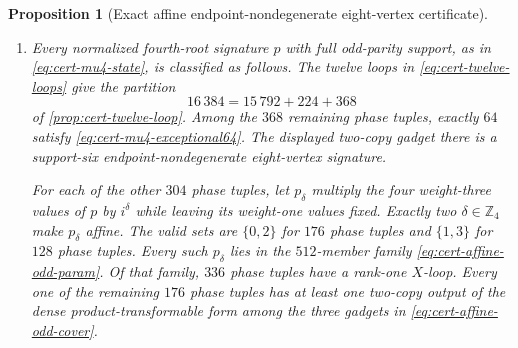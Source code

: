 \documentclass[11pt,letterpaper,onecolumn]{article}
\theoremstyle{plain}
\newtheorem{proposition}[proposition]{Proposition}
\theoremstyle{definition}
\theoremstyle{remark}
\begin{document}
\begin{proposition}[Exact affine endpoint-nondegenerate eight-vertex certificate]
\begin{enumerate}[label=\textnormal{(\roman*)}]
\item Every normalized fourth-root signature \(p\) with full odd-parity support, as in
\cref{eq:cert-mu4-state}, is classified as follows.  The twelve loops in \cref{eq:cert-twelve-loops} give the partition
\[
  16\,384=15\,792+224+368
\]
of \cref{prop:cert-twelve-loop}.  Among the \(368\) remaining phase tuples,
exactly \(64\) satisfy \cref{eq:cert-mu4-exceptional64}. The displayed
two-copy gadget there is a support-six endpoint-nondegenerate eight-vertex signature.

For each of the other \(304\) phase tuples, let \(p_\delta\) multiply the four
weight-three values of \(p\) by \(i^\delta\) while leaving its weight-one
values fixed.  Exactly two \(\delta\in\mathbb Z_4\) make \(p_\delta\)
affine.  The valid sets are
\(\{0,2\}\) for \(176\) phase tuples and \(\{1,3\}\) for \(128\) phase tuples.
Every such \(p_\delta\) lies in the \(512\)-member family
\cref{eq:cert-affine-odd-param}.  Of that family, \(336\) phase tuples have a
rank-one \(X\)-loop. Every one of the remaining \(176\) phase tuples has
at least one two-copy output of the dense product-transformable form among
the three gadgets in
\cref{eq:cert-affine-odd-cover}.
\end{enumerate}
\end{proposition}
\end{document}
